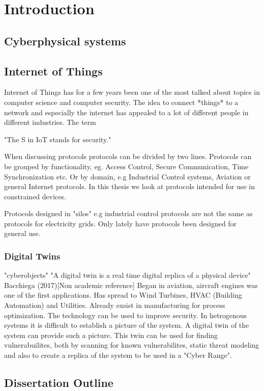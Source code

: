 \chapter{Introduction}
\section{Cyberphysical systems}


\section{Internet of Things}
Internet of Things has for a few years been one of the most talked about topics in computer science and computer security. The idea to connect *things* to a network and especially the internet has appealed to a lot of different people in different industries. The term 

"The S in IoT stands for security."



When discussing protocols protocols can be divided by two lines. Protocols can be grouped by functionality, eg. Access Control, Secure Communication, Time Synchronization etc. Or by domain, e.g Industrial Control systems, Aviation or general Internet protocols. 
In this thesis we look at protocols intended for use in constrained devices. 

Protocols designed in "silos" e.g industrial control protocols are not the same as protocols for electricity grids. 
Only lately have protocols been designed for general use. 


\subsection{Digital Twins}
"cyberobjects"
"A digital twin is a real time digital replica of a physical device" 	Bacchiega (2017)[Non academic reference]
Began in aviation, aircraft engines was one of the first applications. Has spread to Wind Turbines, HVAC (Building Automation) and Utilities. 
Already exsist in manufacturing for process optimization. The technology can be used to improve security. In hetrogenous systems it is difficult to establish a picture of the system. A digital twin of the system can provide such a picture. This twin can be used for finding vulnerabuilites, both by scanning for known vulnerabilites, static threat modeling and also to create a replica of the system to be used in a "Cyber Range". 

\section{Dissertation Outline}
